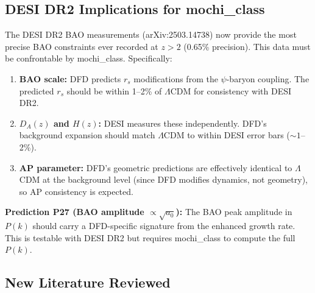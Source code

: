 \documentclass[11pt]{article}
\newcommand{\LCDM}{$\Lambda$CDM}
\newcommand{\aM}{a_0}
\begin{document}
\subsection{DESI DR2 Implications for mochi\_class}

The DESI DR2 BAO measurements (arXiv:2503.14738) now provide the most
precise BAO constraints ever recorded at $z > 2$ (0.65\% precision).
This data must be confrontable by mochi\_class. Specifically:

\begin{enumerate}
  \item \textbf{BAO scale:} DFD predicts $r_s$ modifications from
    the $\psi$-baryon coupling. The predicted $r_s$ should be within
    1--2\% of \LCDM{} for consistency with DESI DR2.
  \item \textbf{$D_A(z)$ and $H(z)$:} DESI measures these independently.
    DFD's background expansion should match \LCDM{} to within
    DESI error bars ($\sim 1$--2\%).
  \item \textbf{AP parameter:} DFD's geometric predictions are
    effectively identical to \LCDM{} at the background level (since
    DFD modifies dynamics, not geometry), so AP consistency is expected.
\end{enumerate}

\textbf{Prediction P27 (BAO amplitude $\propto \sqrt{\aM}$):}
The BAO peak amplitude in $P(k)$ should carry a DFD-specific
signature from the enhanced growth rate. This is testable with
DESI DR2 but requires mochi\_class to compute the full $P(k)$.

\subsection{New Literature Reviewed}
\end{document}
